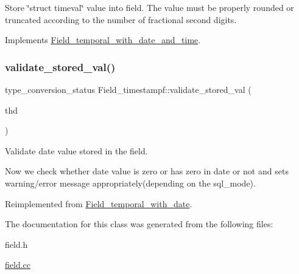 Store \char`\"{}struct timeval\char`\"{} value into field. The value must be properly rounded or truncated according to the number of fractional second digits. 

Implements \mbox{\hyperlink{classField__temporal__with__date__and__time_a3cfd6dc59b102362d592341dbf40a19e}{Field\+\_\+temporal\+\_\+with\+\_\+date\+\_\+and\+\_\+time}}.

\mbox{\label{classField__timestampf_a3a96ed01920259945daf2744367a94f1}} 
\subsubsection{\texorpdfstring{validate\+\_\+stored\+\_\+val()}{validate\_stored\_val()}}
{\footnotesize\ttfamily type\+\_\+conversion\+\_\+status Field\+\_\+timestampf\+::validate\+\_\+stored\+\_\+val (\begin{DoxyParamCaption}\item[{T\+HD $\ast$}]{thd }\end{DoxyParamCaption})\hspace{0.3cm}{\ttfamily [virtual]}}

Validate date value stored in the field.

Now we check whether date value is zero or has zero in date or not and sets warning/error message appropriately(depending on the sql\+\_\+mode). 

Reimplemented from \mbox{\hyperlink{classField__temporal__with__date_af9ebe4d96a6a81232e4a41e4b1d7b599}{Field\+\_\+temporal\+\_\+with\+\_\+date}}.



The documentation for this class was generated from the following files\+:\begin{DoxyCompactItemize}
\item 
field.\+h\item 
\mbox{\hyperlink{field_8cc}{field.\+cc}}\end{DoxyCompactItemize}
